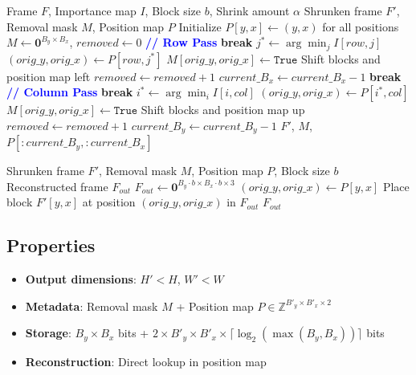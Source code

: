 \documentclass[11pt,a4paper]{article}
\begin{document}
\begin{algorithm}[H]
\caption{Shrink Frame (Position Map)}
\begin{algorithmic}[1]
\Require Frame $F$, Importance map $I$, Block size $b$, Shrink amount $\alpha$
\Ensure Shrunken frame $F'$, Removal mask $M$, Position map $P$
\State Initialize $P[y,x] \gets (y, x)$ for all positions
\State $M \gets \mathbf{0}^{B_y \times B_x}$, $removed \gets 0$
    \State \textcolor{blue}{\textbf{// Row Pass}}
         \textbf{break} \EndIf
        \State $j^* \gets \arg\min_j I[row, j]$
        \State $(orig\_y, orig\_x) \gets P[row, j^*]$
        \State $M[orig\_y, orig\_x] \gets \texttt{True}$
        \State Shift blocks and position map left
        \State $removed \gets removed + 1$
    \EndFor
     $current\_B_x \gets current\_B_x - 1$ \EndIf
     \textbf{break} \EndIf
    \State \textcolor{blue}{\textbf{// Column Pass}}
         \textbf{break} \EndIf
        \State $i^* \gets \arg\min_i I[i, col]$
        \State $(orig\_y, orig\_x) \gets P[i^*, col]$
        \State $M[orig\_y, orig\_x] \gets \texttt{True}$
        \State Shift blocks and position map up
        \State $removed \gets removed + 1$
    \EndFor
     $current\_B_y \gets current\_B_y - 1$ \EndIf
\EndWhile
\State \Return $F'$, $M$, $P[:current\_B_y, :current\_B_x]$
\end{algorithmic}
\end{algorithm}

\begin{algorithm}[H]
\caption{Stretch Frame (Position Map)}
\begin{algorithmic}[1]
\Require Shrunken frame $F'$, Removal mask $M$, Position map $P$, Block size $b$
\Ensure Reconstructed frame $F_{out}$
\State $F_{out} \gets \mathbf{0}^{B_y \cdot b \times B_x \cdot b \times 3}$
        \State $(orig\_y, orig\_x) \gets P[y, x]$
        \State Place block $F'[y, x]$ at position $(orig\_y, orig\_x)$ in $F_{out}$
    \EndFor
\EndFor
\State \Return $F_{out}$
\end{algorithmic}
\end{algorithm}

\subsection{Properties}
\begin{itemize}
    \item \textbf{Output dimensions}: $H' < H$, $W' < W$
    \item \textbf{Metadata}: Removal mask $M$ + Position map $P \in \mathbb{Z}^{B'_y \times B'_x \times 2}$
    \item \textbf{Storage}: $B_y \times B_x$ bits + $2 \times B'_y \times B'_x \times \lceil\log_2(\max(B_y, B_x))\rceil$ bits
    \item \textbf{Reconstruction}: Direct lookup in position map
\end{itemize}
\end{document}
